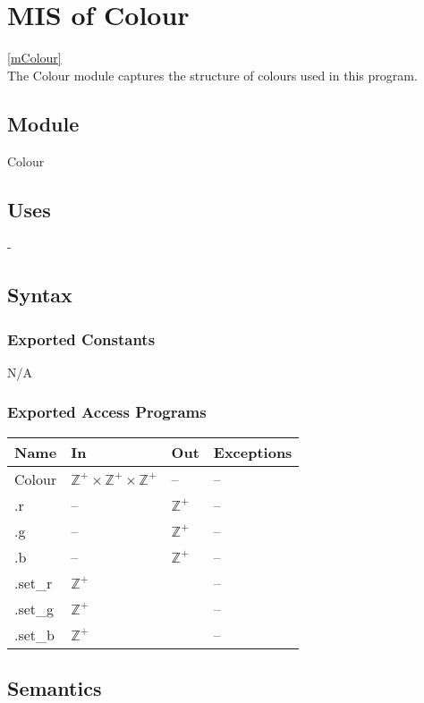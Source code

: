 \documentclass[12pt, titlepage]{article}
\begin{document}
\newpage

\section{MIS of Colour} \ref{mColour} \\
The Colour module captures the structure of colours used in this program.

\subsection{Module}
Colour

\subsection{Uses} -

\subsection{Syntax}
\subsubsection{Exported Constants}
N/A
\subsubsection{Exported Access Programs}
\begin{center}
	\begin{tabular}{p{4cm} p{2cm} p{2cm} p{4cm}}
		\hline
		\textbf{Name} & \textbf{In} & \textbf{Out} & \textbf{Exceptions} \\
		\hline
		Colour & $\mathbb{Z}^+ \times \mathbb{Z}^+ \times \mathbb{Z}^+$ & -- & 
		-- \\
		.r & -- & $\mathbb{Z}^+$ & -- \\
		.g & -- & $\mathbb{Z}^+$ & -- \\		
		.b & -- & $\mathbb{Z}^+$ & -- \\		%
		.set\_r & $\mathbb{Z}^+$ & & -- \\
		.set\_g & $\mathbb{Z}^+$ & & -- \\		
		.set\_b & $\mathbb{Z}^+$ & & -- \\		%
		\hline
	\end{tabular}
\end{center}

\subsection{Semantics}
\end{document}
